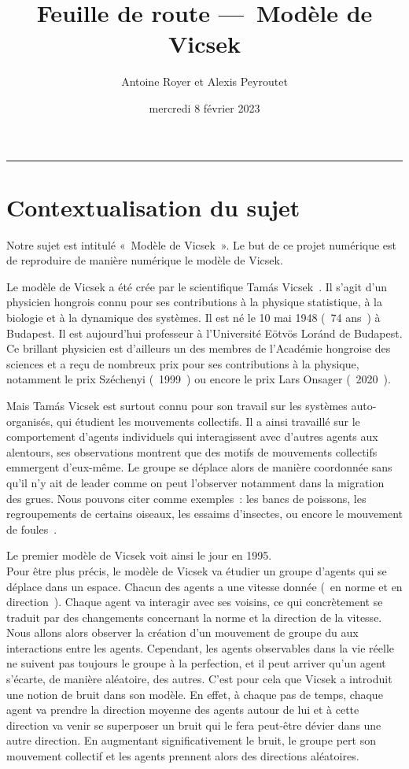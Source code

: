 \documentclass[french, a4paper, 12pt]{article}
\title{\sc Feuille de route —~Modèle de Vicsek}
\author{Antoine Royer et Alexis Peyroutet}
\date{mercredi 8 février 2023}
\begin{document}
 \maketitle \vspace{3pt} \hrule \vspace{3pt}

\section{Contextualisation du sujet}

	Notre sujet est intitulé «~Modèle de Vicsek~». Le but de ce projet numérique est de reproduire de manière numérique le modèle de Vicsek.

	Le modèle de Vicsek a été crée par le scientifique Tamás Vicsek~\cite{wiki-vicsek}. Il s'agit d'un physicien hongrois connu pour ses contributions à la physique statistique, à la biologie et à la dynamique des systèmes. Il est né le 10 mai 1948 (~74 ans~) à Budapest. Il est aujourd'hui professeur à l'Université Eötvös Loránd de Budapest. Ce brillant physicien est d'ailleurs un des membres de l'Académie hongroise des sciences et a reçu de nombreux prix pour ses contributions à la physique, notamment le prix Széchenyi (~1999~) ou encore le prix Lars Onsager (~2020~).

	Mais Tamás Vicsek est surtout connu pour son travail sur les systèmes auto-organisés, qui étudient les mouvements collectifs. Il a ainsi travaillé sur le comportement d'agents individuels qui interagissent avec d'autres agents aux alentours, ses observations montrent que des motifs de mouvements collectifs emmergent d'eux-même. Le groupe se déplace alors de manière coordonnée sans qu'il n'y ait de leader comme on peut l'observer notamment dans la migration des grues. Nous pouvons citer comme exemples~: les bancs de poissons, les regroupements de certains oiseaux, les essaims d'insectes, ou encore le mouvement de foules~\cite{vicsek-paper, wiki-model}.

	 Le premier modèle de Vicsek voit ainsi le jour en 1995.\\

	Pour être plus précis, le modèle de Vicsek va étudier un groupe d'agents qui se déplace dans un espace. Chacun des agents a une vitesse donnée (~en norme et en direction~). Chaque agent va interagir avec ses voisins, ce qui concrètement se traduit par des changements concernant la norme et la direction de la vitesse. Nous allons alors observer la création d'un mouvement de groupe du aux interactions entre les agents. Cependant, les agents observables dans la vie réelle ne suivent pas toujours le groupe à la perfection, et il peut arriver qu'un agent s'écarte, de manière aléatoire, des autres. C'est pour cela que Vicsek a introduit une notion de bruit dans son modèle. En effet, à chaque pas de temps, chaque agent va prendre la direction moyenne des agents autour de lui et à cette direction va venir se superposer un bruit qui le fera peut-être dévier dans une autre direction. En augmentant significativement le bruit, le groupe pert son mouvement collectif et les agents prennent alors des directions aléatoires.\\
\end{document}
